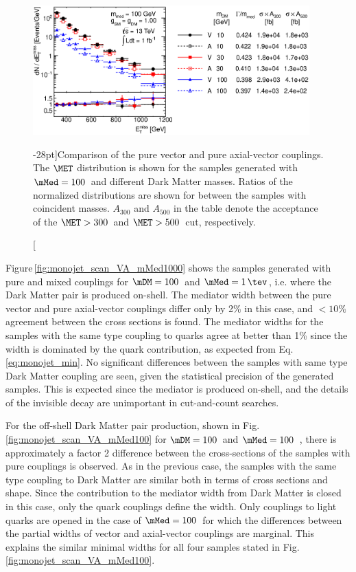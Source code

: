 \begin{figure}
\centering
\includegraphics[width=0.95\textwidth]{figures/monojet/compareModels_VA_100.eps}
\caption[][-28pt]{Comparison of the pure vector and pure axial-vector couplings. The $\MET$ distribution is shown for the samples generated with $\mMed=100$~\gev and different Dark Matter masses. Ratios of the normalized distributions are shown for between the samples with coincident masses. $A_{300}$ and $A_{500}$ in the table denote the acceptance of the $\MET>300$~\gev and $\MET>500$~\gev cut, respectively.}
\label{fig:monojet_VAmodels}
\end{figure}

Figure\,\ref{fig:monojet_scan_VA_mMed1000} shows the samples generated with pure and mixed couplings for $\mDM=100$~\gev and $\mMed=1\,\tev$, i.e. where the Dark Matter pair is produced on-shell. The mediator width between the pure vector and pure axial-vector couplings differ only by 2\% in this case, and $<10\%$ agreement between the cross sections is found. The mediator widths for the samples with the same type coupling to quarks agree at better than 1\% since the width is dominated by the quark contribution, as expected from
Eq.\,\ref{eq:monojet_min}.
No significant differences between the samples with same type Dark Matter coupling are seen, given the statistical precision of the generated samples. This is expected since the mediator is produced on-shell, and the details of the invisible decay are unimportant in cut-and-count searches.

For the off-shell Dark Matter pair production, shown in Fig.\,\ref{fig:monojet_scan_VA_mMed100} for $\mDM=100$~\gev and $\mMed=100$~\gev,
there is approximately a factor 2 difference
between the cross-sections of the samples with pure couplings is observed. As in the previous case, the samples with the same type coupling to Dark Matter are similar both in terms of cross sections and \MET shape. Since the contribution to the mediator width from Dark Matter is closed in this case, only the quark couplings define the width. Only couplings to light quarks are opened in the case of $\mMed=100$~\gev for which the differences between the partial widths of vector and axial-vector couplings are marginal. This explains the similar minimal widths for all four samples stated in Fig.\,\ref{fig:monojet_scan_VA_mMed100}.

